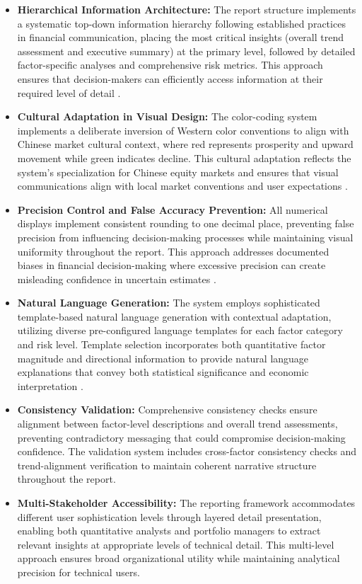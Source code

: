 \documentclass[3p,times,procedia]{elsarticle}
\begin{document}
\begin{itemize}
    \item \textbf{Hierarchical Information Architecture:} The report structure implements a systematic top-down information hierarchy following established practices in financial communication, placing the most critical insights (overall trend assessment and executive summary) at the primary level, followed by detailed factor-specific analyses and comprehensive risk metrics. This approach ensures that decision-makers can efficiently access information at their required level of detail \cite{Jorion2001}.

    \item \textbf{Cultural Adaptation in Visual Design:} The color-coding system implements a deliberate inversion of Western color conventions to align with Chinese market cultural context, where red represents prosperity and upward movement while green indicates decline. This cultural adaptation reflects the system's specialization for Chinese equity markets and ensures that visual communications align with local market conventions and user expectations \cite{FinReportDataset2025}.

    \item \textbf{Precision Control and False Accuracy Prevention:} All numerical displays implement consistent rounding to one decimal place, preventing false precision from influencing decision-making processes while maintaining visual uniformity throughout the report. This approach addresses documented biases in financial decision-making where excessive precision can create misleading confidence in uncertain estimates \cite{Harvey2016}.

    \item \textbf{Natural Language Generation:} The system employs sophisticated template-based natural language generation with contextual adaptation, utilizing diverse pre-configured language templates for each factor category and risk level. Template selection incorporates both quantitative factor magnitude and directional information to provide natural language explanations that convey both statistical significance and economic interpretation \cite{Loughran2011}.

    \item \textbf{Consistency Validation:} Comprehensive consistency checks ensure alignment between factor-level descriptions and overall trend assessments, preventing contradictory messaging that could compromise decision-making confidence. The validation system includes cross-factor consistency checks and trend-alignment verification to maintain coherent narrative structure throughout the report.

    \item \textbf{Multi-Stakeholder Accessibility:} The reporting framework accommodates different user sophistication levels through layered detail presentation, enabling both quantitative analysts and portfolio managers to extract relevant insights at appropriate levels of technical detail. This multi-level approach ensures broad organizational utility while maintaining analytical precision for technical users.
\end{itemize}
\end{document}
